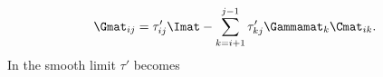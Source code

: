 \begin{equation}
  \Gmat_{ i j} = \tau'_{ i j} \Imat -  \sum\limits_{k = i + 1}^{j-1}\tau'_{k j} \Gammamat_k\Cmat_{i k}.
\end{equation}
In the smooth limit $\tau'$ becomes